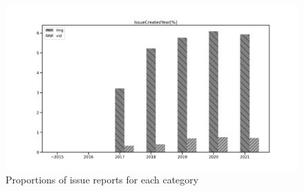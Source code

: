 
\begin{figure}[h]
\centering
\includegraphics[width=0.6\linewidth]{./figures/data-category-trend.pdf}
\caption{ 
  Proportions of issue reports for each category
  }
\label{fig:data-cat-trend}
\end{figure}
